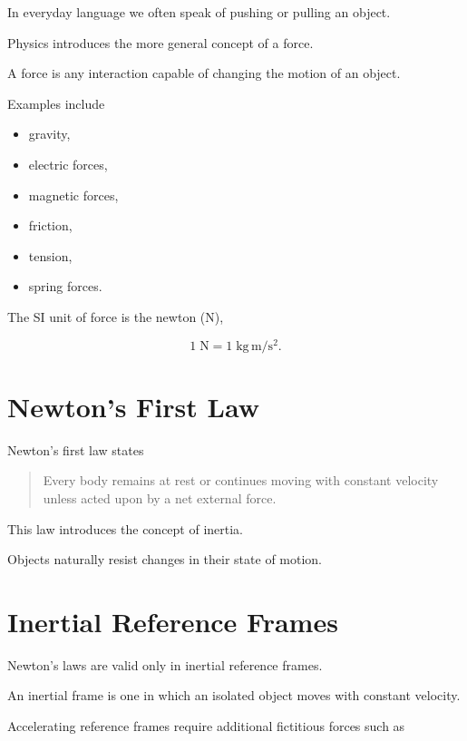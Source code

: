 \documentclass[11pt,a4paper,openany]{book}
\begin{document}
In everyday language we often speak of pushing or pulling an object.

Physics introduces the more general concept of a force.

A force is any interaction capable of changing the motion of an object.

Examples include

\begin{itemize}
	\item gravity,
	\item electric forces,
	\item magnetic forces,
	\item friction,
	\item tension,
	\item spring forces.
\end{itemize}

The SI unit of force is the newton (N),

\[
1\;\mathrm N
=
1\;\mathrm{kg\,m/s^2}.
\]


\section{Newton's First Law}

Newton's first law states

\begin{quote}
	Every body remains at rest or continues moving with constant velocity unless
	acted upon by a net external force.
\end{quote}

This law introduces the concept of inertia.

Objects naturally resist changes in their state of motion.


\section{Inertial Reference Frames}

Newton's laws are valid only in inertial reference frames.

An inertial frame is one in which an isolated object moves with constant velocity.

Accelerating reference frames require additional fictitious forces such as
\end{document}
